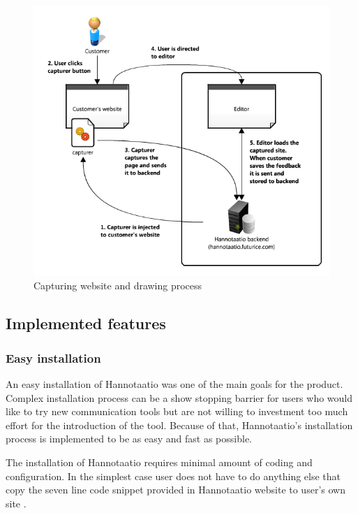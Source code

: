 \documentclass[english,12pt,a4paper,pdftex]{article}
\begin{document}
\begin{figure}[htb]
\begin{center}
\includegraphics[width=1.0\textwidth]{hannotaatio_architecture.png}
\end{center}
\caption{Capturing website and drawing process}
\label{fig:hannotaatio_architecture}
\end{figure}

\subsection{Implemented features}

\subsubsection{Easy installation}

An easy installation of Hannotaatio was one of the main goals for the product. Complex installation process can be a show stopping barrier for users who would like to try new communication tools but are not willing to investment too much effort for the introduction of the tool. Because of that, Hannotaatio's installation process is implemented to be as easy and fast as possible.

The installation of Hannotaatio requires minimal amount of coding and configuration. In the simplest case user does not have to do anything else that copy the seven line code snippet provided in Hannotaatio website to user's own site \citep{hannotaatio}.
\end{document}
